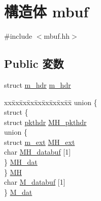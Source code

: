 \hypertarget{structtru64_1_1mbuf}{
\section{構造体 mbuf}
\label{structtru64_1_1mbuf}
}


{\ttfamily \#include $<$mbuf.hh$>$}\subsection*{Public 変数}
\begin{DoxyCompactItemize}
\item 
struct \hyperlink{structtru64_1_1m__hdr}{m\_\-hdr} \hyperlink{structtru64_1_1mbuf_aa7448f4702259a6b5b293bfbbc40afeb}{m\_\-hdr}
\item 
\begin{tabbing}
xx\=xx\=xx\=xx\=xx\=xx\=xx\=xx\=xx\=\kill
union \{\\
\>struct \{\\
\>\>struct \hyperlink{structtru64_1_1pkthdr}{pkthdr} \hyperlink{structtru64_1_1mbuf_adca58591f5f605b62a9b829b5ef735e4}{MH\_pkthdr}\\
\>\>union \{\\
\>\>\>struct \hyperlink{structtru64_1_1m__ext}{m\_ext} \hyperlink{structtru64_1_1mbuf_af3e2ba05d43e480171c51bf862d27e7e}{MH\_ext}\\
\>\>\>char \hyperlink{structtru64_1_1mbuf_a470cda2f7f80ca73f549ab2211c594fd}{MH\_databuf} \mbox{[}1\mbox{]}\\
\>\>\} \hyperlink{structtru64_1_1mbuf_a7a1a7e5edab35557c5e2aa9c9bfe1d13}{MH\_dat}\\
\>\} \hyperlink{structtru64_1_1mbuf_a4506dc50eb5d0df018fda5cc381e8159}{MH}\\
\>char \hyperlink{structtru64_1_1mbuf_ab652936b1669dc52dd990d46e8ec7014}{M\_databuf} \mbox{[}1\mbox{]}\\
\} \hyperlink{structtru64_1_1mbuf_a38a5fa62835970de08268c242badb86e}{M\_dat}\\

\end{tabbing}\end{DoxyCompactItemize}


